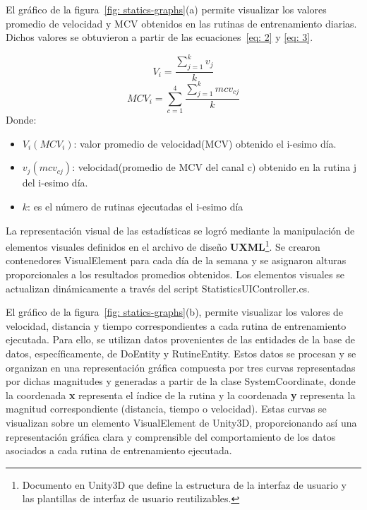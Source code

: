 \newpage
{}
El gráfico de la figura~\ref{fig: statics-graphs}(a) permite visualizar los valores promedio de velocidad y MCV obtenidos en las rutinas de entrenamiento diarias. Dichos valores se obtuvieron a partir de las ecuaciones~\ref{eq: 2} y \ref{eq: 3}.    

\begin{equation}
    V_{i} = \frac{\sum_{j=1}^{k} v_{j}}{k}
    \label{eq: 2}
    \end{equation}
    \begin{equation}
    MCV_{i} = \sum_{c=1}^{4}\frac{\sum_{j=1}^{k} mcv_{c j}}{k}
    \label{eq: 3}
\end{equation}
Donde:
\begin{itemize}
    \item $V_{i} (MCV_{i})$: valor promedio de velocidad(MCV) obtenido el i-esimo día.
    \item $v_{j}(mcv_{cj})$: velocidad(promedio de MCV del canal c) obtenido en la rutina j del i-esimo día. 
    \item $k$: es el número de rutinas ejecutadas el i-esimo día 
\end{itemize}
La representación visual de las estadísticas se logró mediante la manipulación de elementos visuales definidos en el archivo de diseño \textbf{UXML}\footnote{Documento en Unity3D que define la estructura de la interfaz de usuario y las plantillas de interfaz de usuario reutilizables.}. Se crearon contenedores VisualElement para cada día de la semana y se asignaron alturas proporcionales a los resultados promedios obtenidos. Los elementos visuales se actualizan dinámicamente a través del script StatisticsUIController.cs.

El gráfico de la figura~\ref{fig: statics-graphs}(b), permite visualizar los valores de velocidad, distancia y tiempo correspondientes a cada rutina de entrenamiento ejecutada. Para ello, se utilizan datos provenientes de las entidades de la base de datos, específicamente, de DoEntity y RutineEntity. Estos datos se procesan y se organizan en una representación gráfica compuesta por tres curvas representadas por dichas magnitudes y generadas a partir de la clase SystemCoordinate, donde la coordenada \textbf{x} representa el índice de la rutina y la coordenada \textbf{y} representa la magnitud correspondiente (distancia, tiempo o velocidad). Estas curvas  se visualizan sobre un elemento VisualElement de Unity3D, proporcionando así una representación gráfica clara y comprensible del comportamiento de los datos asociados a cada rutina de entrenamiento ejecutada.
    


